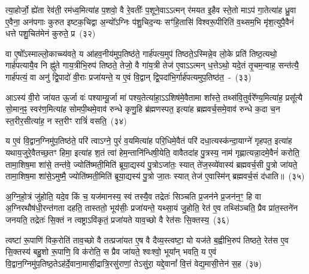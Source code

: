 त्या॒होर्जो॒ ह्ये॑ता रेव॑ती॒ रम॑ध्व॒मित्या॑ह प॒शवो॒ वै रे॒वतीः᳚ प॒शूने॒वा\-ऽऽ\-त्मन् र॑मयत इ॒हैव स्ते॒तो मा\-ऽप॑ गा॒तेत्या॑ह ध्रु॒वा ए॒वैना॒ अन॑पगाः कुरुत इष्टक॒चिद्वा अ॒न्यो᳚\-ऽग्निः प॑शु॒चिद॒न्यः सꣳ॑हि॒तासि॑ विश्वरू॒पीरिति॑ व॒थ्सम॒भि मृ॑श॒त्युपै॒वैनं॑ धत्ते पशु॒चित॑मेनं कुरुते॒ प्र~(३२)

वा ए॒षो᳚\-ऽस्माल्लो॒काच्च्य॑वते॒ य आ॑हव॒नीय॑मुप॒तिष्ठ॑ते॒ गार्\mbox{}ह॑पत्य॒मुप॑ तिष्ठते॒\-ऽस्मिन्ने॒व लो॒के प्रति॑ तिष्ठ॒त्यथो॒ गार्\mbox{}ह॑पत्यायै॒व नि ह्नु॑ते गाय॒त्रीभि॒रुप॑ तिष्ठते॒ तेजो॒ वै गा॑य॒त्री तेज॑ ए॒वा\-ऽऽ\-त्मन् ध॒त्ते\-ऽथो॒ यदे॒तं तृ॒चम॒न्वाह॒ सन्त॑त्यै॒ गार्\mbox{}ह॑पत्यं॒ वा अनु॑ द्वि॒पादो॑ वी॒राः प्रजा॑यन्ते॒ य ए॒वं वि॒द्वान् द्वि॒पदा॑भि॒र्गार्\mbox{}ह॑पत्यमुप॒तिष्ठ॑त॒~-~(३३)

आ\-ऽस्य॑ वी॒रो जा॑यत ऊ॒र्जा वः॑ पश्याम्यू॒र्जा मा॑ पश्य॒तेत्या॑हा॒\-ऽऽ\-शिष॑मे॒वैतामा शा᳚स्ते॒ तथ्स॑वि॒तुर्वरे᳚ण्य॒मित्या॑ह॒ प्रसू᳚त्यै सो॒मान॒ꣴ॒ स्वर॑ण॒मित्या॑ह सोमपी॒थमे॒वाव॑ रुन्धे कृणु॒हि ब्र॑ह्मणस्पत॒ इत्या॑ह ब्रह्मवर्च॒समे॒वाव॑ रुन्धे क॒दा च॒न स्त॒रीर॒सीत्या॑ह॒ न स्त॒रीꣳ रात्रिं॑ वसति॒~(३४)

य ए॒वं वि॒द्वान॒ग्निमु॑प॒तिष्ठ॑ते॒ परि॑ त्वा\-ऽग्ने॒ पुरं॑ व॒यमित्या॑ह परि॒धिमे॒वैतं परि॑ दधा॒त्यस्क॑न्दा॒याग्ने॑ गृहपत॒ इत्या॑ह यथाय॒जुरे॒वैतच्छ॒तꣳ हिमा॒ इत्या॑ह श॒तं त्वा॑ हेम॒न्तानि॑न्धिषी॒\-येति॒ वावैतदा॑ह पु॒त्रस्य॒ नाम॑ गृह्णात्यन्ना॒दमे॒वैनं॑ करोति॒ तामा॒\-शिष॒मा शा॑से॒ तन्त॑वे॒ ज्योति॑ष्मती॒मिति॑ ब्रूया॒द्यस्य॑ पु॒त्रो\-ऽजा॑तः॒ स्यात् ते॑ज॒स्व्ये॑वास्य॑ ब्रह्मवर्च॒सी पु॒त्रो जा॑यते॒ तामा॒शिष॒मा शा॑से॒\-ऽमुष्मै॒ ज्योति॑ष्मती॒मिति॑ ब्रूया॒द्यस्य॑ पु॒त्रो जा॒तः स्यात् तेज॑ ए॒वास्मि॑न् ब्रह्मवर्च॒सं द॑धाति॥~(३५)

{}%

अ॒ग्नि॒हो॒त्रं जु॑होति॒ यदे॒व किं च॒ यज॑मानस्य॒ स्वं तस्यै॒व तद्रेतः॑ सिञ्चति प्र॒जन॑ने प्र॒जन॑न॒ꣳ॒ हि वा अ॒ग्निरथौष॑धी॒रन्त॑गता दहति॒ तास्ततो॒ भूय॑सीः॒ प्रजा॑यन्ते॒ यथ्सा॒यं जु॒होति॒ रेत॑ ए॒व तथ्सि॑ञ्चति॒ प्रैव प्रा॑त॒स्तने॑न जनयति॒ तद्रेतः॑ सि॒क्तं न त्वष्ट्रा\-ऽवि॑कृतं॒ प्रजा॑यते याव॒च्छो वै रेत॑सः सि॒क्तस्य॒~(३६)

त्वष्टा॑ रू॒पाणि॑ विक॒रोति॑ ताव॒च्छो वै तत्प्रजा॑यत ए॒ष वै दैव्य॒स्त्वष्टा॒ यो यज॑ते ब॒ह्वीभि॒रुप॑ तिष्ठते॒ रेत॑स ए॒व सि॒क्तस्य॑ बहु॒शो रू॒पाणि॒ वि क॑रोति॒ स प्रैव जा॑यते॒ श्वःश्वो॒ भूया᳚न् भवति॒ य ए॒वं वि॒द्वान॒ग्निमु॑प॒तिष्ठ॒ते\-ऽह॑र्दे॒वाना॒\-मासी॒द्रात्रि॒रसु॑राणां॒ ते\-ऽसु॑रा॒ यद्दे॒वानां᳚ वि॒त्तं वेद्य॒मासी॒त्तेन॑ स॒ह~(३७)

